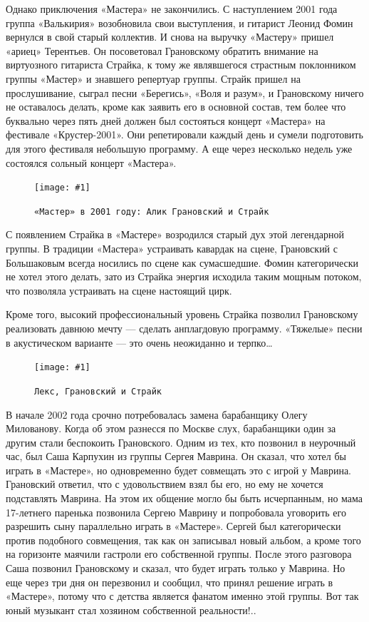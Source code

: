 \documentclass[10pt, twoside]{book}
\newcommand{\myincludegraphics}[1]{\texttt{[image: \#1]}}
\begin{document}
Однако приключения «Мастера» не закончились. С наступлением 2001 года группа «Валькирия» возобновила свои выступления, и
гитарист Леонид Фомин вернулся в свой старый коллектив. И снова на выручку «Мастеру» пришел «ариец» Терентьев. Он
посоветовал Грановскому обратить внимание на виртуозного гитариста Страйка, к тому же являвшегося страстным поклонником
группы «Мастер» и знавшего репертуар группы. Страйк пришел на прослушивание, сыграл песни «Берегись», «Воля и разум», и
Грановскому ничего не оставалось делать, кроме как заявить его в основной состав, тем более что буквально через пять
дней должен был состояться концерт «Мастера» на фестивале «Крустер-2001». Они репетировали каждый день и сумели
подготовить для этого фестиваля небольшую программу. А еще через несколько недель уже состоялся сольный концерт
«Мастера».

\begin{figure}[h]
    \centering
    \myincludegraphics{Image34}
    \caption{\texttt{«Мастер» в 2001 году: Алик Грановский и Страйк}}
\end{figure}

С появлением Страйка в «Мастере» возродился старый дух этой легендарной группы. В традиции «Мастера» устраивать кавардак
на сцене, Грановский с Большаковым всегда носились по сцене как сумасшедшие. Фомин категорически не хотел этого делать,
зато из Страйка энергия исходила таким мощным потоком, что позволяла устраивать на сцене настоящий цирк.

Кроме того, высокий профессиональный уровень Страйка позволил Грановскому реализовать давнюю мечту — сделать анплагдовую
программу. «Тяжелые» песни в акустическом варианте — это очень неожиданно и терпко\ldots

\begin{figure}[h]
    \centering
    \myincludegraphics{Image35}
    \caption{\texttt{Лекс, Грановский и Страйк}}
\end{figure}

В начале 2002 года срочно потребовалась замена барабанщику Олегу Милованову. Когда об этом разнесся по Москве слух,
барабанщики один за другим стали беспокоить Грановского. Одним из тех, кто позвонил в неурочный час, был Саша Карпухин
из группы Сергея Маврина. Он сказал, что хотел бы играть в «Мастере», но одновременно будет совмещать это с игрой у
Маврина. Грановский ответил, что с удовольствием взял бы его, но ему не хочется подставлять Маврина. На этом их общение
могло бы быть исчерпанным, но мама 17-летнего паренька позвонила Сергею Маврину и попробовала уговорить его разрешить
сыну параллельно играть в «Мастере». Сергей был категорически против подобного совмещения, так как он записывал новый
альбом, а кроме того на горизонте маячили гастроли его собственной группы. После этого разговора Саша позвонил
Грановскому и сказал, что будет играть только у Маврина. Но еще через три дня он перезвонил и сообщил, что принял
решение играть в «Мастере», потому что с детства является фанатом именно этой группы. Вот так юный музыкант стал
хозяином собственной реальности!..
\end{document}

